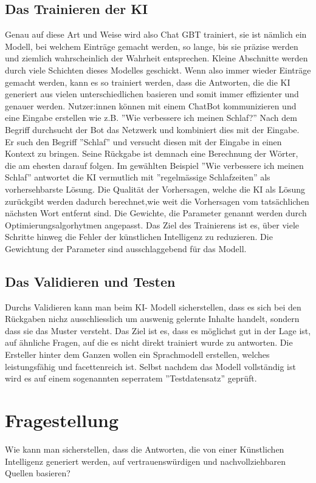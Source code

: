 \documentclass{article}
\begin{document}
\subsection{Das Trainieren der KI} 
Genau auf diese Art und Weise wird also Chat GBT trainiert, sie ist nämlich ein Modell, bei welchem Einträge gemacht werden, so lange, bis sie präzise werden und ziemlich wahrscheinlich der Wahrheit entsprechen. Kleine Abschnitte werden durch viele Schichten dieses Modelles geschickt. Wenn also immer wieder Einträge gemacht werden, kann es so trainiert werden, dass die Antworten, die die KI generiert aus vielen unterschiedlichen basieren und somit immer effizienter und genauer werden. Nutzer:innen können mit einem ChatBot kommunizieren und eine Eingabe erstellen wie z.B. ''Wie verbessere ich meinen Schlaf?'' Nach dem Begriff durchsucht der Bot das Netzwerk und kombiniert dies mit der Eingabe. Er such den Begriff ''Schlaf'' und versucht diesen mit der Eingabe in einen Kontext zu bringen. Seine Rückgabe ist demnach eine Berechnung der Wörter, die am ehesten darauf folgen. Im gewählten Beispiel ''Wie verbessere ich meinen Schlaf'' antwortet die KI vermutlich mit ''regelmässige Schlafzeiten'' als vorhersehbarste Lösung. Die Qualität der Vorhersagen, welche die KI als Lösung zurückgibt werden dadurch berechnet,wie weit die Vorhersagen vom tatsächlichen nächsten Wort entfernt sind.
Die Gewichte, die Parameter genannt werden durch Optimierungsalgorhytmen angepasst. Das Ziel des Trainierens ist es, über viele Schritte hinweg die Fehler der künstlichen Intelligenz zu reduzieren. Die Gewichtung der Parameter sind ausschlaggebend für das Modell.

\subsection{Das Validieren und Testen}
Durchs Validieren kann man beim KI- Modell sicherstellen, dass es sich bei den Rückgaben nichz ausschliesslich um auswenig gelernte Inhalte handelt, sondern dass sie das Muster versteht. Das Ziel ist es, dass es möglichst gut in der Lage ist, auf ähnliche Fragen, auf die es nicht direkt trainiert wurde zu antworten. Die Ersteller hinter dem Ganzen wollen ein Sprachmodell erstellen, welches leistungsfähig und facettenreich ist. Selbst nachdem das Modell vollständig ist wird es auf einem sogenannten seperratem ''Testdatensatz'' geprüft.

\section{Fragestellung}
Wie kann man sicherstellen, dass die Antworten, die von einer Künstlichen Intelligenz generiert werden, auf vertrauenswürdigen und nachvollziehbaren Quellen basieren?
\end{document}
